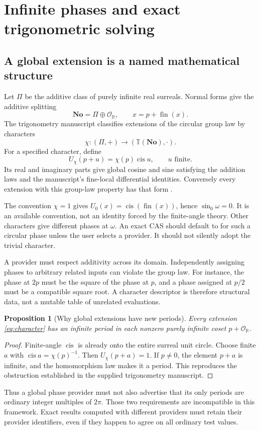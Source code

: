 \documentclass[11pt,letterpaper]{article}
\newtheorem{proposition}[theorem]{Proposition}
\theoremstyle{definition}
\newcommand{\No}{\mathbf{No}}
\newcommand{\R}{\mathbb R}
\newcommand{\OO}{\mathcal O}
\newcommand{\fin}{\operatorname{fin}}
\newcommand{\cis}{\operatorname{cis}}
\newcommand{\code}[1]{\texttt{\detokenize{#1}}}
\numberwithin{equation}{section}
\begin{document}
\section{Infinite phases and exact trigonometric solving}\label{sec:phases}
\subsection{A global extension is a named mathematical structure}
Let $\Pi$ be the additive class of purely infinite real surreals. Normal forms give the additive splitting
\[
 \No=\Pi\oplus\OO_{\R},\qquad x=p+\fin(x).
\]
The trigonometry manuscript classifies extensions of the circular group law by characters
\[
 \chi:(\Pi,+)\longrightarrow(\mathbb T(\No),\cdot).
\]
For a specified character, define
\begin{equation}\label{eq:character}
 U_\chi(p+u)=\chi(p)\cis u,\qquad u\text{ finite}.
\end{equation}
Its real and imaginary parts give global cosine and sine satisfying the addition laws and the manuscript's fine-local differential identities. Conversely every extension with this group-law property has that form \cite[``All circular group-law extensions'']{SourceTrig}.

The convention $\chi=1$ gives $U_0(x)=\cis(\fin(x))$, hence $\sin_0\omega=0$. It is an available convention, not an identity forced by the finite-angle theory. Other characters give different phases at $\omega$. An exact CAS should default to \code{ExtensionRequired} for such a circular phase unless the user selects a provider. It should not silently adopt the trivial character.

A provider must respect additivity across its domain. Independently assigning phases to arbitrary related inputs can violate the group law. For instance, the phase at $2p$ must be the square of the phase at $p$, and a phase assigned at $p/2$ must be a compatible square root. A character descriptor is therefore structural data, not a mutable table of unrelated evaluations.

\begin{proposition}[Why global extensions have new periods]\label{prop:periods}
Every extension \eqref{eq:character} has an infinite period in each nonzero purely infinite coset $p+\OO_\R$.
\end{proposition}
\begin{proof}
Finite-angle $\cis$ is already onto the entire surreal unit circle. Choose finite $a$ with $\cis a=\chi(p)^{-1}$. Then $U_\chi(p+a)=1$. If $p\ne0$, the element $p+a$ is infinite, and the homomorphism law makes it a period. This reproduces the obstruction established in the supplied trigonometry manuscript.
\end{proof}
Thus a global phase provider must not also advertise that its only periods are ordinary integer multiples of $2\pi$. Those two requirements are incompatible in this framework. Exact results computed with different providers must retain their provider identifiers, even if they happen to agree on all ordinary test values.
\end{document}
